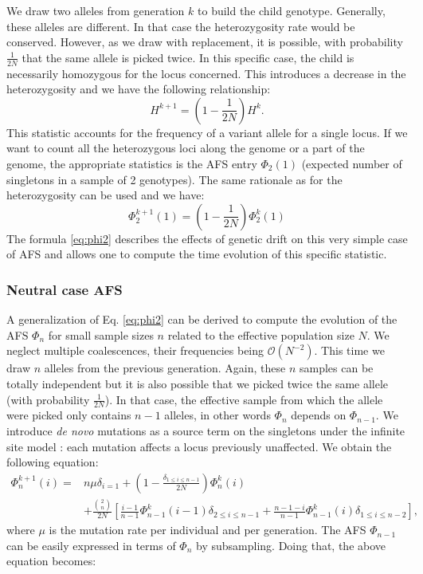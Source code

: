 We draw two alleles from generation $k$ to build the child genotype. Generally, these alleles are different. In that case the heterozygosity rate would be conserved. However, as we draw with replacement, it is possible, with probability $\frac{1}{2N}$ that the same allele is picked twice. In this specific case, the child is necessarily homozygous for the locus concerned. This introduces a decrease in the heterozygosity and we have the following relationship: 
$$
	H^{k+1} = (1-\frac{1}{2N})H^k.
$$ 
This statistic accounts for the frequency of a variant allele for a single locus. If we want to count all the heterozygous loci along the genome or a part of the genome, the appropriate statistics is the AFS entry $\Phi_2(1)$ (expected number of singletons in a sample of 2 genotypes). The same rationale as for the heterozygosity can be used and we have:
\begin{equation}\label{eq:phi2}
 \Phi_2^{k+1}(1) = (1-\frac{1}{2N})\Phi_2^k(1)
\end{equation}
The formula \eqref{eq:phi2} describes the effects of genetic drift on this very simple case of AFS and allows one to compute the time evolution of this specific statistic.

\subsubsection{Neutral case AFS} 
A generalization of Eq. \eqref{eq:phi2} can be derived to compute the evolution of the AFS $\Phi_n$ for small sample sizes $n$ related to the effective population size $N$.
We neglect multiple coalescences, their frequencies being $\mathcal{O}(N^{-2})$. This time we draw $n$ alleles from the previous generation. Again, these $n$ samples can be totally independent but it is also possible that we picked twice the same allele (with probability $\frac{1}{2N}$). In that case, the effective sample from which the allele were picked only contains $n-1$ alleles, in other words $\Phi_n$ depends on $\Phi_{n-1}$. We introduce \textit{de novo} mutations as a source term on the singletons under the infinite site model \cite{kimura1969}: each mutation affects a locus previously unaffected. We obtain the following equation:
\begin{equation*}
\begin{split}
\Phi_n^{k+1}(i) =& n\mu \delta_{i=1} + (1-\frac{\delta_{1\leq i\leq n-1}}{2N})\Phi_n^{k}(i) \\
			 &+ \frac{\binom{2}{n}}{2N} \left[\frac{i-1}{n-1}\Phi_{n-1}^{k}(i-1)\delta_{2\leq i\leq n-1} +\frac{n-1-i}{n-1}\Phi_{n-1}^{k}(i)\delta_{1\leq i\leq n-2} \right],
\end{split}
\end{equation*}
where $\mu$ is the mutation rate per individual and per generation.
The AFS $\Phi_{n-1}$ can be easily expressed in terms of $\Phi_n$ by subsampling. Doing that, the above equation becomes:

